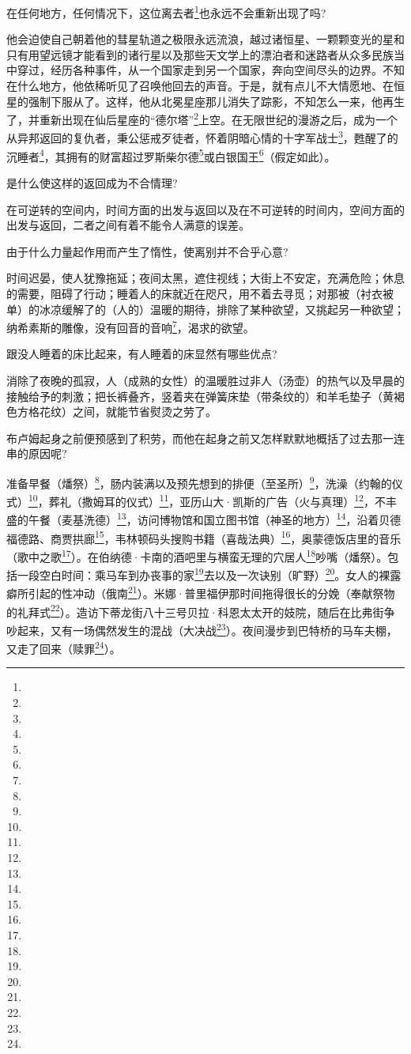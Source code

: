 \par 在任何地方，任何情况下，这位离去者\footnote{}也永远不会重新出现了吗?
\par 他会迫使自己朝着他的彗星轨道之极限永远流浪，越过诸恒星、一颗颗变光的星和只有用望远镜才能看到的诸行星以及那些天文学上的漂泊者和迷路者从众多民族当中穿过，经历各种事件，从一个国家走到另一个国家，奔向空间尽头的边界。不知在什么地方，他依稀听见了召唤他回去的声音。于是，就有点儿不大情愿地、在恒星的强制下服从了。这样，他从北冕星座那儿消失了踪影，不知怎么一来，他再生了，并重新出现在仙后星座的“德尔塔”\footnote{}上空。在无限世纪的漫游之后，成为一个从异邦返回的复仇者，秉公惩戒歹徒者，怀着阴暗心情的十字军战士\footnote{}，甦醒了的沉睡者\footnote{}，其拥有的财富超过罗斯柴尔德\footnote{}或白银国王\footnote{}（假定如此）。
\par 是什么使这样的返回成为不合情理?
\par 在可逆转的空间内，时间方面的出发与返回以及在不可逆转的时间内，空间方面的出发与返回，二者之间有着不能令人满意的误差。
\par 由于什么力量起作用而产生了惰性，使离别并不合乎心意?
\par 时间迟晏，使人犹豫拖延；夜间太黑，遮住视线；大街上不安定，充满危险；休息的需要，阻碍了行动；睡着人的床就近在咫尺，用不着去寻觅；对那被（衬衣被单）的冰凉缓解了的（人的）温暖的期待，排除了某种欲望，又挑起另一种欲望；纳希素斯的雕像，没有回音的音响\footnote{}，渴求的欲望。
\par 跟没人睡着的床比起来，有人睡着的床显然有哪些优点?
\par 消除了夜晚的孤寂，人（成熟的女性）的温暖胜过非人（汤壶）的热气以及早晨的接触给予的刺激；把长裤叠齐，竖着夹在弹簧床垫（带条纹的）和羊毛垫子（黄褐色方格花纹）之间，就能节省熨烫之劳了。
\par 布卢姆起身之前便预感到了积劳，而他在起身之前又怎样默默地概括了过去那一连串的原因呢?
\par 准备早餐（燔祭）\footnote{}，肠内装满以及预先想到的排便（至圣所）\footnote{}，洗澡（约翰的仪式）\footnote{}，葬礼（撒姆耳的仪式）\footnote{}，亚历山大·凯斯的广告（火与真理）\footnote{}，不丰盛的午餐（麦基洗德）\footnote{}，访问博物馆和国立图书馆（神圣的地方）\footnote{}，沿着贝德福德路、商贾拱廊\footnote{}，韦林顿码头搜购书籍（喜哉法典）\footnote{}，奥蒙德饭店里的音乐（歌中之歌\footnote{}）。在伯纳德·卡南的酒吧里与横蛮无理的穴居人\footnote{}吵嘴（燔祭）。包括一段空白时间：乘马车到办丧事的家\footnote{}去以及一次诀别（旷野）\footnote{}。女人的裸露癖所引起的性冲动（俄南\footnote{}）。米娜·普里福伊那时间拖得很长的分娩（奉献祭物的礼拜式\footnote{}）。造访下蒂龙街八十三号贝拉·科恩太太开的妓院，随后在比弗街争吵起来，又有一场偶然发生的混战（大决战\footnote{}）。夜间漫步到巴特桥的马车夫棚，又走了回来（赎罪\footnote{}）。
